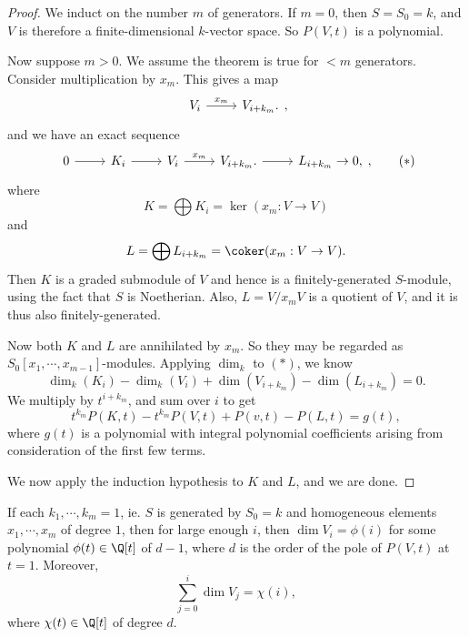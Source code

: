\documentclass[a4paper]{article}
\begin{document}
\begin{proof}
  We induct on the number $m$ of generators. If $m = 0$, then $S = S_0 = k$, and $V$ is therefore a finite-dimensional $k$-vector space. So $P(V, t)$ is a polynomial.

  Now suppose $m > 0$. We assume the theorem is true for $<m$ generators. Consider multiplication by $x_m$. This gives a map
  \[
    \begin{tikzcd}
      V_i \ar[r, "x_m"] & V_{i + k_m}.
    \end{tikzcd},
  \]
  and we have an exact sequence
  \[
    \begin{tikzcd}
      0 \ar[r] & K_i \ar[r] & V_i \ar[r, "x_m"] & V_{i + k_m}.\ar [r] & L_{i + k_m} \to 0,
    \end{tikzcd},\tag{$*$}
  \]
  where
  \[
    K = \bigoplus K_i = \ker (x_m: V \to V)
  \]
  and
  \[
    L = \bigoplus L_{i + k_m} = \coker (x_m: V \to V).
  \]
  Then $K$ is a graded submodule of $V$ and hence is a finitely-generated $S$-module, using the fact that $S$ is Noetherian. Also, $L = V/x_m V$ is a quotient of $V$, and it is thus also finitely-generated.

  Now both $K$ and $L$ are annihilated by $x_m$. So they may be regarded as $S_0[x_1, \cdots, x_{m - 1}]$-modules. Applying $\dim_k$ to $(*)$, we know
  \[
    \dim_k (K_i) - \dim_k (V_i) + \dim (V_{i + k_m}) - \dim (L_{i + k_m}) = 0.
  \]
  We multiply by $t^{i + k_m}$, and sum over $i$ to get
  \[
    t^{k_m} P(K, t) - t^{k_m} P(V, t) + P(v, t) - P(L, t) = g(t),
  \]
  where $g(t)$ is a polynomial with integral polynomial coefficients arising from consideration of the first few terms.

  We now apply the induction hypothesis to $K$ and $L$, and we are done.
\end{proof}

\begin{cor}
  If each $k_1, \cdots, k_m = 1$, ie. $S$ is generated by $S_0 = k$ and homogeneous elements $x_1, \cdots, x_m$ of degree $1$, then for large enough $i$, then $\dim V_i = \phi(i)$ for some polynomial $\phi(t) \in \Q[t]$ of $d - 1$, where $d$ is the order of the pole of $P(V, t)$ at $t = 1$. Moreover,
  \[
    \sum_{j = 0}^i \dim V_j = \chi(i),
  \]
  where $\chi(t) \in \Q[t]$ of degree $d$.
\end{cor}
\end{document}
